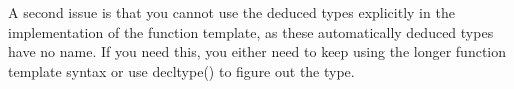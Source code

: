 A second issue is that you cannot use the deduced types explicitly in the implementation of the function template, as these automatically deduced types have no name. If you need this, you either need to keep using the longer function template syntax or use decltype() to figure out the type.






















